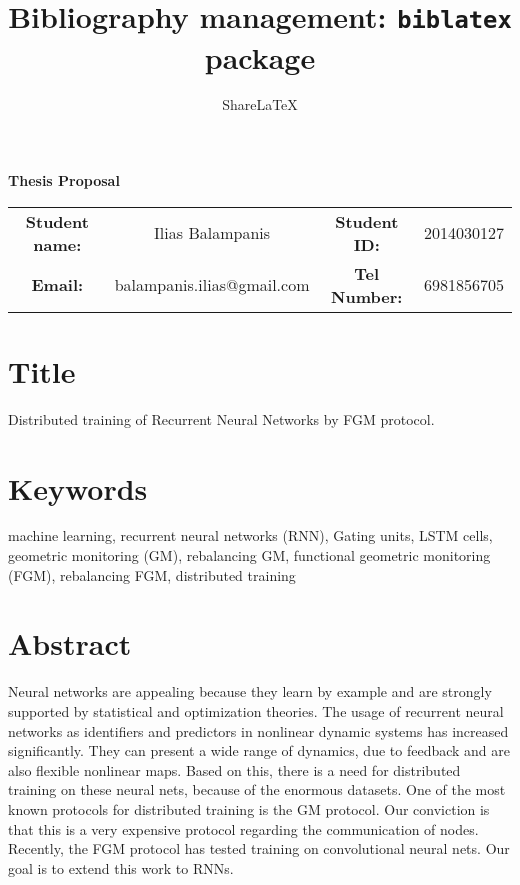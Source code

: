 \documentclass{article}
\title{Bibliography management: \texttt{biblatex} package}
\author{Share\LaTeX}
\date{ }
\begin{document}
    \begin{center}
        \LARGE{\textbf{Thesis Proposal}}\\[.5cm]
    \end{center}
    \begin{table}[h!]
        \begin{tabular}{ c c c c }
            \textbf{Student name:} & Ilias Balampanis & \textbf{Student ID:} & 2014030127  \\
            \textbf{Email:} & balampanis.ilias@gmail.com &  \textbf{Tel Number:} & 6981856705 \\
        \end{tabular}
    \end{table}


    \section*{Title}
    Distributed training of Recurrent Neural Networks by FGM protocol.

    \section*{Keywords}
    machine learning, recurrent neural networks (RNN), Gating units, LSTM cells, geometric monitoring (GM), rebalancing GM, functional geometric monitoring (FGM), rebalancing FGM, distributed training

    \section*{Abstract}
    Neural networks are appealing because they learn by example and are strongly supported by statistical and optimization theories.
    The usage of recurrent neural networks as identifiers and predictors in nonlinear dynamic systems has increased significantly.
    They can present a wide range of dynamics, due to feedback and are also flexible nonlinear maps.
    Based on this, there is a need for distributed training on these neural nets, because of the enormous datasets.
    One of the most known protocols for distributed training is the GM protocol.
    Our conviction is that this is a very expensive protocol regarding the communication of nodes.
    Recently, the FGM protocol has tested training on convolutional neural nets.
    Our goal is to extend this work to RNNs.
\end{document}

